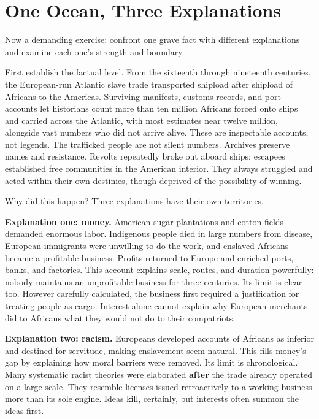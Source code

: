 \section{One Ocean, Three Explanations}
Now a demanding exercise: confront one grave fact with different explanations and examine each one's strength and boundary.

First establish the factual level. From the sixteenth through nineteenth centuries, the European-run Atlantic slave trade transported shipload after shipload of Africans to the Americas. Surviving manifests, customs records, and port accounts let historians count more than ten million Africans forced onto ships and carried across the Atlantic, with most estimates near twelve million, alongside vast numbers who did not arrive alive. These are inspectable accounts, not legends. The trafficked people are not silent numbers. Archives preserve names and resistance. Revolts repeatedly broke out aboard ships; escapees established free communities in the American interior. They always struggled and acted within their own destinies, though deprived of the possibility of winning.

Why did this happen? Three explanations have their own territories.

\textbf{Explanation one: money.} American sugar plantations and cotton fields demanded enormous labor. Indigenous people died in large numbers from disease, European immigrants were unwilling to do the work, and enslaved Africans became a profitable business. Profits returned to Europe and enriched ports, banks, and factories. This account explains scale, routes, and duration powerfully: nobody maintains an unprofitable business for three centuries. Its limit is clear too. However carefully calculated, the business first required a justification for treating people as cargo. Interest alone cannot explain why European merchants did to Africans what they would not do to their compatriots.

\textbf{Explanation two: racism.} Europeans developed accounts of Africans as inferior and destined for servitude, making enslavement seem natural. This fills money's gap by explaining how moral barriers were removed. Its limit is chronological. Many systematic racist theories were elaborated \textbf{after} the trade already operated on a large scale. They resemble licenses issued retroactively to a working business more than its sole engine. Ideas kill, certainly, but interests often summon the ideas first.

